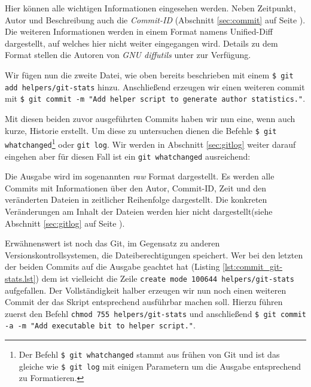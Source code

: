 

Hier können alle wichtigen Informationen eingesehen werden. Neben Zeitpunkt,
Autor und Beschreibung auch die \textit{Commit-ID} (Abschnitt \ref{sec:commit}
auf Seite \pageref{sec:commit}). Die weiteren Informationen werden in einem
Format namens Unified-Diff dargestellt, auf welches hier nicht weiter
eingegangen wird. Details zu dem Format stellen die Autoren von \textit{GNU
diffutils} unter \cite[S.~12-13]{paper:diffutils} zur Verfügung.

Wir fügen nun die zweite Datei, wie oben bereits beschrieben mit einem
\texttt{\$ git add helpers/git-stats} hinzu. Anschließend erzeugen wir einen
weiteren \gls{commit} mit \texttt{\$ git commit -m "Add helper script to
generate author statistics."}.



Mit diesen beiden zuvor ausgeführten Commits haben wir nun eine, wenn auch
kurze, Historie erstellt. Um diese zu untersuchen dienen die Befehle
\texttt{\$ git whatchanged}\footnote{Der Befehl \texttt{\$ git whatchanged} stammt
aus frühen von Git und ist das gleiche wie \texttt{\$ git log} mit einigen
Parametern um die Ausgabe entsprechend zu Formatieren.} oder \texttt{git log}.
Wir werden in Abschnitt \ref{sec:gitlog} weiter darauf eingehen aber für diesen
Fall ist ein \texttt{git whatchanged} ausreichend:



Die Ausgabe wird im sogenannten \textit{raw} Format dargestellt. Es werden alle
Commits mit Informationen über den Autor, Commit-ID, Zeit und den veränderten
Dateien in zeitlicher Reihenfolge dargestellt. Die konkreten Veränderungen am
Inhalt der Dateien werden hier nicht dargestellt(siehe Abschnitt
\ref{sec:gitlog} auf Seite \pageref{sec:gitlog}).

Erwähnenswert ist noch das Git, im Gegensatz zu anderen
Versionskontrollsystemen, die Dateiberechtigungen speichert. Wer bei den
letzten der beiden Commits auf die Ausgabe geachtet hat (Listing
\ref{lst:commit_git-stats.lst}) dem ist vielleicht die Zeile \texttt{create
mode 100644 helpers/git-stats} aufgefallen. Der Vollständigkeit halber erzeugen
wir nun noch einen weiteren Commit der das Skript entsprechend ausführbar
machen soll. Hierzu führen zuerst den Befehl \texttt{chmod 755
helpers/git-stats} und anschließend \texttt{\$ git commit -a -m "Add executable
bit to helper script."}.

